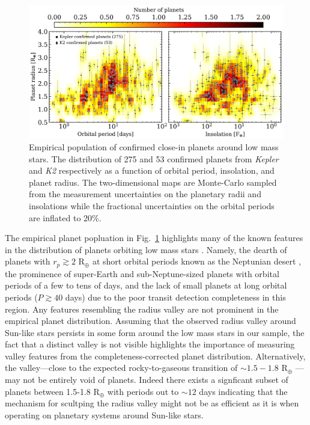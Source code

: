 \documentclass[twocolumn]{emulateapj}
\newcommand{\kepler}[1]{\emph{Kepler}#1}
\newcommand{\ktwo}[1]{\emph{K2}#1}
\begin{document}
\begin{figure}
  \centering
  \includegraphics[width=0.98\hsize]{figures/Ndetmap_Msgt0d0_xbin45_ybin27.png}
  \caption{Empirical population of confirmed close-in planets around low mass stars.
    The distribution of 275 and 53 confirmed planets from \kepler{}
    and \ktwo{} respectively as a function of orbital period, insolation, and planet radius. The two-dimensional maps are
    Monte-Carlo sampled from the measurement uncertainties on the planetary radii and insolations while 
    the fractional uncertainties on the orbital periods are inflated to
    20\%.} %
  \label{fig:Ndet}
\end{figure}





The empirical planet popluation in Fig.~\ref{fig:Ndet} highlights many of the known features in the distribution of
planets orbiting low mass stars \citep[e.g.][]{morton14,dressing15a,gaidos16}. Namely, the dearth of planets with
$r_p\gtrsim 2$ R$_{\oplus}$ at short orbital periods known as the Neptunian desert \citep{lundkvist16,mazeh16},
the prominence of super-Earth and sub-Neptune-sized planets with orbital periods of a few to tens of days,
and the lack of small planets at long orbital periods ($P\gtrsim 40$ days) due to the poor transit detection
completeness in this region. Any features resembling the radius valley are not prominent in the empirical planet
distribution. Assuming that the observed radius valley around Sun-like stars persists in some form around the low
mass stars in our sample, the fact that a distinct valley is not visible highlights the importance of measuring valley
features from the completeness-corrected planet distribution. Alternatively, the valley---close to the expected rocky-to-gaseous
transition of $\sim 1.5-1.8$ R$_{\oplus}$ \citep{weiss14}---may not be entirely void of planets. Indeed there exists a
signficant subset of planets between 1.5-1.8 R$_{\oplus}$ with periods out to $\sim 12$ days indicating that the mechanism
for scultping the radius valley might not be as efficient as it is when operating on planetary systems around Sun-like
stars.
\end{document}
